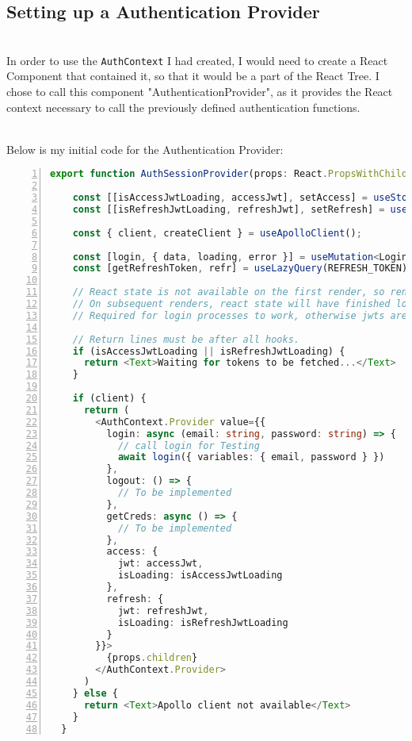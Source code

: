\documentclass[../../main.tex]{subfiles}
\begin{document}
\subsection{Setting up a Authentication Provider}

\noindent \\ In order to use the \lstinline{AuthContext} I had
created, I would need to create a React Component that contained it,
so that it would be a part of the React Tree. I chose to call this
component "AuthenticationProvider", as it provides the React context
necessary to call the previously defined authentication functions.

\noindent \\ Below is my initial code for the Authentication Provider:

\begin{lstlisting}[language=typescript, numbers=left, framesep=6pt]
  export function AuthSessionProvider(props: React.PropsWithChildren) {
    
    const [[isAccessJwtLoading, accessJwt], setAccess] = useStorageState("access")
    const [[isRefreshJwtLoading, refreshJwt], setRefresh] = useStorageState("refresh")
  
    const { client, createClient } = useApolloClient();
  
    const [login, { data, loading, error }] = useMutation<LoginData>(LOGIN);
    const [getRefreshToken, refr] = useLazyQuery(REFRESH_TOKEN);
  
    // React state is not available on the first render, so render a placeholder on the first render
    // On subsequent renders, react state will have finished loading.
    // Required for login processes to work, otherwise jwts are blank -> isexpiredjwt fails -> always goes to login screen
  
    // Return lines must be after all hooks.
    if (isAccessJwtLoading || isRefreshJwtLoading) {
      return <Text>Waiting for tokens to be fetched...</Text>
    }
  
    if (client) {
      return (
        <AuthContext.Provider value={{
          login: async (email: string, password: string) => {
            // call login for Testing
            await login({ variables: { email, password } })
          },
          logout: () => {
            // To be implemented
          },
          getCreds: async () => {
            // To be implemented
          },
          access: {
            jwt: accessJwt,
            isLoading: isAccessJwtLoading
          },
          refresh: {
            jwt: refreshJwt,
            isLoading: isRefreshJwtLoading
          }
        }}>
          {props.children}
        </AuthContext.Provider>
      )
    } else {
      return <Text>Apollo client not available</Text>
    }
  }
\end{lstlisting}
\end{document}
